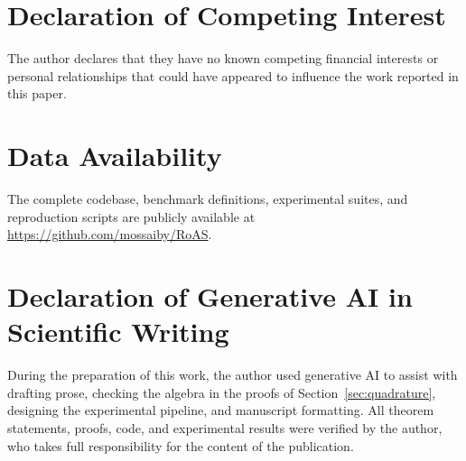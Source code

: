 \documentclass[preprint,12pt]{elsarticle}
\begin{document}
\section*{Declaration of Competing Interest}
The author declares that they have no known competing financial interests or personal relationships that could have appeared to influence the work reported in this paper.

\section*{Data Availability}
The complete codebase, benchmark definitions, experimental suites, and reproduction scripts are publicly available at \url{https://github.com/mossaiby/RoAS}.

\section*{Declaration of Generative AI in Scientific Writing}
During the preparation of this work, the author used generative AI to assist with drafting prose, checking the algebra in the proofs of Section~\ref{sec:quadrature}, designing the experimental pipeline, and manuscript formatting. All theorem statements, proofs, code, and experimental results were verified by the author, who takes full responsibility for the content of the publication.



\end{document}
